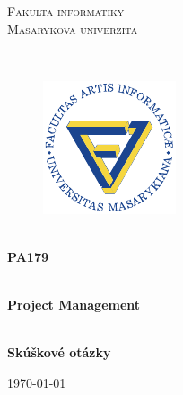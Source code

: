 \documentclass[11pt,a4paper]{article}
\begin{document}

\begin{titlepage}

    \begin{center}
        \vfill {%
            \Huge{%
                \textsc{%
                    Fakulta informatiky\\[3mm]%
                    Masarykova univerzita%
                }%
            }%
        }%

        \hfill\\[15mm]

        \begin{figure}[!h]
            \centering
            \includegraphics[scale=3]{muni-fi-logo.pdf}
        \end{figure}

        \hfill\\[10mm]

        \Huge{
            \textbf{
                PA179
            }
        }

        \hfill\\[-10mm]

        \huge{
            \textbf{
                Project Management
            }
        }

        \hfill\\[10mm]

        \LARGE{
            \textbf{
                Skúškové otázky
            }
        }
        \vfill

        \Large{
            \today
        }

    \end{center}
\end{titlepage}

\setlength{\parskip}{0pt}
    \hypersetup{hidelinks}\tableofcontents
\setlength{\parskip}{0pt}

\newpage

\end{document}
